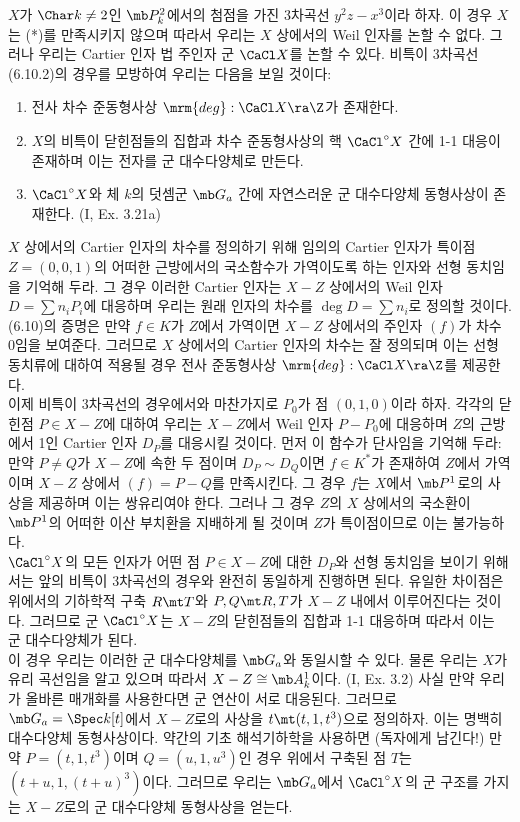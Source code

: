 	
	\begin{example}
	$X$가 $\Char k\ne 2$인 $\mb P_k^2$에서의 첨점을 가진 3차곡선 $y^2z-x^3$이라 하자.
	이 경우 $X$는 (*)를 만족시키지 않으며 따라서 우리는 $X$ 상에서의 Weil 인자를 논할 수 없다.
	그러나 우리는 Cartier 인자 법 주인자 군 $\CaCl X$를 논할 수 있다.
	비특이 3차곡선 (6.10.2)의 경우를 모방하여 우리는 다음을 보일 것이다:
	\begin{enumerate}[label=(\alph*)]
	\item 전사 차수 준동형사상 $\mrm{deg}:\CaCl X\ra\Z$가 존재한다.
	\item $X$의 비특이 닫힌점들의 집합과 차수 준동형사상의 핵 $\CaCl^\circ X$ 간에 1-1 대응이 존재하며
	이는 전자를 군 대수다양체로 만든다.
	\item $\CaCl^\circ X$와 체 $k$의 덧셈군 $\mb G_a$ 간에 자연스러운 군 대수다양체 동형사상이 존재한다. (I, Ex. 3.21a)
	\end{enumerate}
	$X$ 상에서의 Cartier 인자의 차수를 정의하기 위해 임의의 Cartier 인자가
	특이점 $Z=(0,0,1)$의 어떠한 근방에서의 국소함수가 가역이도록 하는 인자와 선형 동치임을 기억해 두라.
	그 경우 이러한 Cartier 인자는 $X-Z$ 상에서의 Weil 인자 $D=\sum n_iP_i$에 대응하며
	우리는 원래 인자의 차수를 $\deg D=\sum n_i$로 정의할 것이다.
	(6.10)의 증명은 만약 $f\in K$가 $Z$에서 가역이면 $X-Z$ 상에서의 주인자 $(f)$가 차수 0임을 보여준다.
	그러므로 $X$ 상에서의 Cartier 인자의 차수는 잘 정의되며
	이는 선형 동치류에 대하여 적용될 경우 전사 준동형사상 $\mrm{deg}:\CaCl X\ra\Z$를 제공한다.\\
	이제 비특이 3차곡선의 경우에서와 마찬가지로 $P_0$가 점 $(0,1,0)$이라 하자.
	각각의 닫힌점 $P\in X-Z$에 대하여 우리는 $X-Z$에서 Weil 인자 $P-P_0$에 대응하며 $Z$의 근방에서 1인
	Cartier 인자 $D_P$를 대응시킬 것이다.
	먼저 이 함수가 단사임을 기억해 두라: 만약 $P\ne Q$가 $X-Z$에 속한 두 점이며 $D_P\sim D_Q$이면
	$f\in K^*$가 존재하여 $Z$에서 가역이며 $X-Z$ 상에서 $(f)=P-Q$를 만족시킨다.
	그 경우 $f$는 $X$에서 $\mb P^1$로의 사상을 제공하며 이는 쌍유리여야 한다.
	그러나 그 경우 $Z$의 $X$ 상에서의 국소환이 $\mb P^1$의 어떠한 이산 부치환을 지배하게 될 것이며
	$Z$가 특이점이므로 이는 불가능하다.\\
	$\CaCl^\circ X$의 모든 인자가 어떤 점 $P\in X-Z$에 대한 $D_P$와 선형 동치임을 보이기 위해서는
	앞의 비특이 3차곡선의 경우와 완전히 동일하게 진행하면 된다.
	유일한 차이점은 위에서의 기하학적 구축 $R\mt T$와 $P,Q\mt R,T$가 $X-Z$ 내에서 이루어진다는 것이다.
	그러므로 군 $\CaCl^\circ X$는 $X-Z$의 닫힌점들의 집합과 1-1 대응하며 따라서 이는 군 대수다양체가 된다.\\
	이 경우 우리는 이러한 군 대수다양체를 $\mb G_a$와 동일시할 수 있다.
	물론 우리는 $X$가 유리 곡선임을 알고 있으며 따라서 $X-Z\cong\mb A_k^1$이다. (I, Ex. 3.2)
	사실 만약 우리가 올바른 매개화를 사용한다면 군 연산이 서로 대응된다.
	그러므로 $\mb G_a=\Spec k[t]$에서 $X-Z$로의 사상을 $t\mt(t,1,t^3)$으로 정의하자.
	이는 명백히 대수다양체 동형사상이다. 약간의 기초 해석기하학을 사용하면 (독자에게 남긴다!)
	만약 $P=(t,1,t^3)$이며 $Q=(u,1,u^3)$인 경우 위에서 구축된 점 $T$는 $(t+u,1,(t+u)^3)$이다.
	그러므로 우리는 $\mb G_a$에서 $\CaCl^\circ X$의 군 구조를 가지는 $X-Z$로의 군 대수다양체 동형사상을 얻는다.
	\end{example}
	
